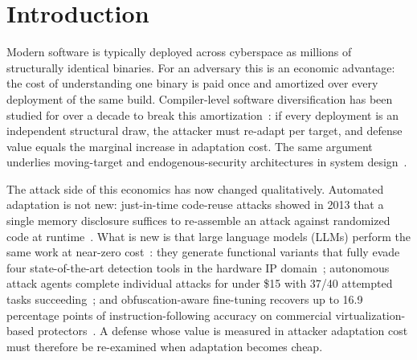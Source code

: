 \documentclass[pdflatex,sn-mathphys-num]{sn-jnl}
\theoremstyle{thmstyleone}%
\theoremstyle{thmstyletwo}%
\theoremstyle{thmstylethree}%
\begin{document}

\section{Introduction}

Modern software is typically deployed across cyberspace as millions of
structurally identical binaries. For an adversary this is an economic
advantage: the cost of understanding one binary is paid once and amortized over
every deployment of the same build. Compiler-level software diversification
has been studied for over a decade to break this
amortization~\cite{bib2,franz2010unibus,homescu2013librando,crane2015readactor}:
if every deployment is an independent structural draw, the attacker must
re-adapt per target, and defense value equals the marginal increase in
adaptation cost. The same argument underlies moving-target and
endogenous-security architectures in system design~\cite{bib1}.

The attack side of this economics has now changed qualitatively. Automated
adaptation is not new: just-in-time code-reuse attacks showed in 2013 that a
single memory disclosure suffices to re-assemble an attack against randomized
code at runtime~\cite{snow2013jitrop}. What is new is that large language
models (LLMs) perform the same work at near-zero
cost~\cite{pearce2022asleep,perry2023users}: they generate functional variants
that fully evade four state-of-the-art detection tools in the hardware IP
domain~\cite{gohil2025llmpirate}; autonomous attack agents complete individual
attacks for under \$15 with 37/40 attempted tasks
succeeding~\cite{singer2026incalmo}; and obfuscation-aware fine-tuning
recovers up to 16.9 percentage points of instruction-following accuracy on
commercial virtualization-based protectors~\cite{wang2026oasif}. A defense
whose value is measured in attacker adaptation cost must therefore be
re-examined when adaptation becomes cheap.
\end{document}

